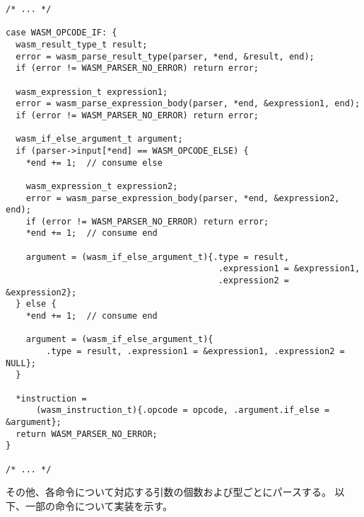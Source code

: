 \begin{lstlisting}[caption=命令のパース,label=lst:argument_t]
/* ... */

case WASM_OPCODE_IF: {
  wasm_result_type_t result;
  error = wasm_parse_result_type(parser, *end, &result, end);
  if (error != WASM_PARSER_NO_ERROR) return error;

  wasm_expression_t expression1;
  error = wasm_parse_expression_body(parser, *end, &expression1, end);
  if (error != WASM_PARSER_NO_ERROR) return error;

  wasm_if_else_argument_t argument;
  if (parser->input[*end] == WASM_OPCODE_ELSE) {
    *end += 1;  // consume else

    wasm_expression_t expression2;
    error = wasm_parse_expression_body(parser, *end, &expression2, end);
    if (error != WASM_PARSER_NO_ERROR) return error;
    *end += 1;  // consume end

    argument = (wasm_if_else_argument_t){.type = result,
                                          .expression1 = &expression1,
                                          .expression2 = &expression2};
  } else {
    *end += 1;  // consume end

    argument = (wasm_if_else_argument_t){
        .type = result, .expression1 = &expression1, .expression2 = NULL};
  }

  *instruction =
      (wasm_instruction_t){.opcode = opcode, .argument.if_else = &argument};
  return WASM_PARSER_NO_ERROR;
}

/* ... */
\end{lstlisting}

その他、各命令について対応する引数の個数および型ごとにパースする。
以下、一部の命令について実装を示す。


